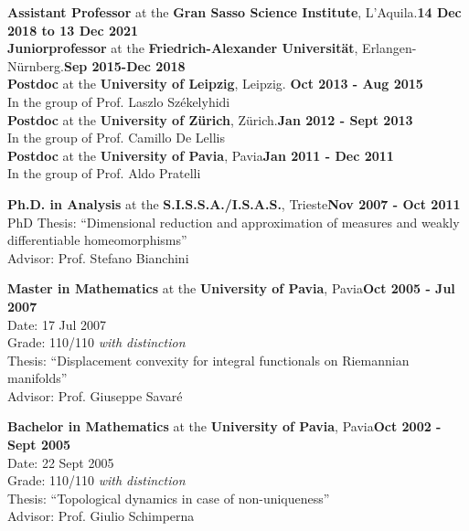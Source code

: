 \documentclass[10pt]{article}
\newcommand{\blankline}{\quad\pagebreak[2]}
\begin{document}
\textbf{Assistant Professor} at the \textbf{Gran Sasso Science Institute}, L'Aquila.\hfill\textbf{14 Dec 2018 to 13 Dec 2021}\\

\textbf{Juniorprofessor} at the \textbf{Friedrich-Alexander Universit\"at},\newline
 Erlangen-N\"urnberg.\hfill\textbf{Sep 2015-Dec 2018}\\

\textbf{Postdoc} at the \textbf{University of Leipzig}, Leipzig. \hfill\textbf{Oct 2013 - Aug 2015}\\
In the group of Prof. Laszlo Sz\'ekelyhidi\\

\textbf{Postdoc} at the \textbf{University of Z\"urich}, Z\"urich.\hfill\textbf{Jan 2012 - Sept 2013}\\
In the group of Prof. Camillo De Lellis\\

\textbf{Postdoc} at the \textbf{University of Pavia}, Pavia\hfill\textbf{Jan 2011 - Dec 2011}\\
In the group of Prof. Aldo Pratelli\\
\blankline

\textbf{Ph.D. in Analysis} at the \textbf{S.I.S.S.A./I.S.A.S.}, Trieste\hfill\textbf{Nov 2007 - Oct 2011}\\
PhD Thesis: ``Dimensional reduction and approximation of measures and weakly differentiable
homeomorphisms''\\
Advisor: Prof. Stefano Bianchini\\


\blankline

\textbf{Master in Mathematics} at the \textbf{University of Pavia}, 
Pavia\hfill \textbf{Oct 2005 - Jul 2007}\\
Date: 17 Jul 2007\\
Grade: 110/110 \emph{with distinction}\\
Thesis: ``Displacement convexity for integral functionals on Riemannian manifolds''\\
Advisor: Prof. Giuseppe Savar\'e\\
\blankline 

\textbf{Bachelor in Mathematics} at the \textbf{University of Pavia}, 
Pavia\hfill \textbf{Oct 2002 - Sept 2005}\\
Date: 22 Sept 2005\\
Grade: 110/110 \emph{with distinction}\\
Thesis: ``Topological dynamics in case of non-uniqueness'' \\
Advisor: Prof. Giulio Schimperna
\blankline 
\newpage
\end{document}
